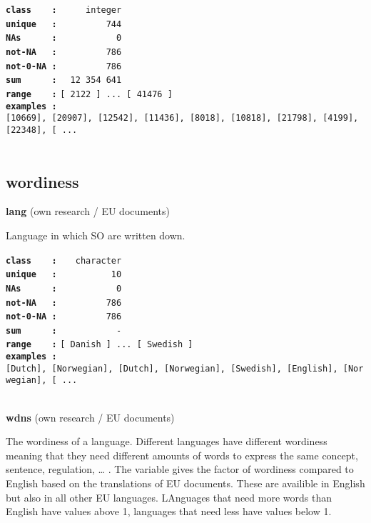 \documentclass[]{article}
\begin{document}
\textbf{\texttt{class\ \ \ \ :}} \texttt{~~~~~integer}\\
\textbf{\texttt{unique\ \ \ :}} \texttt{~~~~~~~~~744}\\
\textbf{\texttt{NAs\ \ \ \ \ \ :}} \texttt{~~~~~~~~~~~0}\\
\textbf{\texttt{not-NA\ \ \ :}} \texttt{~~~~~~~~~786}\\
\textbf{\texttt{not-0-NA\ :}} \texttt{~~~~~~~~~786}\\
\textbf{\texttt{sum\ \ \ \ \ \ :}} \texttt{~~12~354~641}\\
\textbf{\texttt{range\ \ \ \ :}}
\texttt{{[}\ 2122\ {]}\ ...\ {[}\ 41476\ {]}}\\
\textbf{\texttt{examples\ :}}
\texttt{{[}10669{]},\ {[}20907{]},\ {[}12542{]},\ {[}11436{]},\ {[}8018{]},\ {[}10818{]},\ {[}21798{]},\ {[}4199{]},\ {[}22348{]},\ {[}\ ...}\\

~

\subsection{wordiness}\label{wordiness}

\textbf{lang} (own research / EU documents)

Language in which SO are written down.

\textbf{\texttt{class\ \ \ \ :}} \texttt{~~~character}\\
\textbf{\texttt{unique\ \ \ :}} \texttt{~~~~~~~~~~10}\\
\textbf{\texttt{NAs\ \ \ \ \ \ :}} \texttt{~~~~~~~~~~~0}\\
\textbf{\texttt{not-NA\ \ \ :}} \texttt{~~~~~~~~~786}\\
\textbf{\texttt{not-0-NA\ :}} \texttt{~~~~~~~~~786}\\
\textbf{\texttt{sum\ \ \ \ \ \ :}} \texttt{~~~~~~~~~~~-}\\
\textbf{\texttt{range\ \ \ \ :}}
\texttt{{[}\ Danish\ {]}\ ...\ {[}\ Swedish\ {]}}\\
\textbf{\texttt{examples\ :}}
\texttt{{[}Dutch{]},\ {[}Norwegian{]},\ {[}Dutch{]},\ {[}Norwegian{]},\ {[}Swedish{]},\ {[}English{]},\ {[}Norwegian{]},\ {[}\ ...}\\

~

\textbf{wdns} (own research / EU documents)

The wordiness of a language. Different languages have different
wordiness meaning that they need different amounts of words to express
the same concept, sentence, regulation, \ldots{} . The variable gives
the factor of wordiness compared to English based on the translations of
EU documents. These are availible in English but also in all other EU
languages. LAnguages that need more words than English have values above
1, languages that need less have values below 1.
\end{document}
